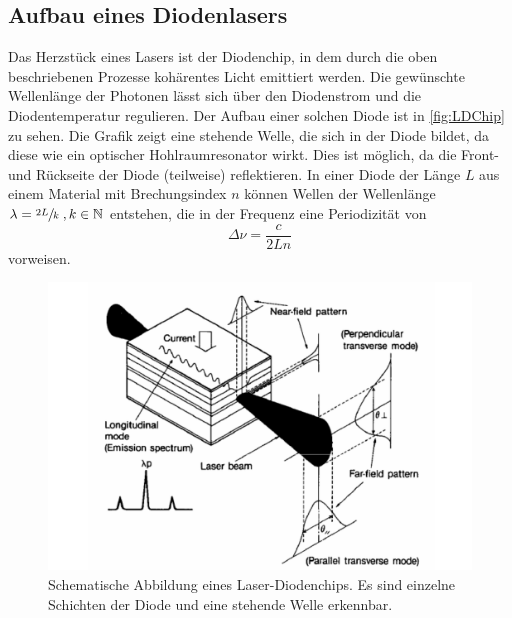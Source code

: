 \subsection{Aufbau eines Diodenlasers}
Das Herzstück eines Lasers ist der Diodenchip, in dem durch die oben beschriebenen Prozesse kohärentes Licht emittiert werden. Die gewünschte Wellenlänge der Photonen lässt sich 
über den Diodenstrom und die Diodentemperatur regulieren. Der Aufbau einer solchen Diode ist in \autoref{fig:LDChip} zu sehen. Die Grafik zeigt eine stehende Welle, die sich in 
der Diode bildet, da diese wie ein optischer Hohlraumresonator wirkt. Dies ist möglich, da die Front- und Rückseite der Diode (teilweise) reflektieren. 
In einer Diode der Länge $L$ aus einem Material mit Brechungsindex $n$ können Wellen der Wellenlänge $\lambda = \sfrac{2L}{k}  \;,k \in \mathbb{N}$ entstehen, die in der Frequenz 
eine Periodizität von 
\begin{equation}
    \label{eq:delta_nu}
    \Delta \nu = \frac{c}{2Ln}
\end{equation}  
vorweisen.

\begin{figure}
    \centering
    \includegraphics[scale=0.4]{content/pics/LDChip.png}
    \caption{Schematische Abbildung eines Laser-Diodenchips. Es sind einzelne Schichten der Diode und eine stehende Welle erkennbar. \cite{diode_laser_spectroscopy}}
    \label{fig:LDChip}
\end{figure}
